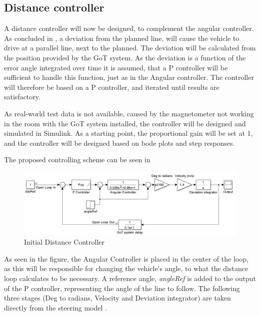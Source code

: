 \subsection{Distance controller}
A distance controller will now be designed, to complement the angular controller.
As concluded in , a deviation from the planned line, will cause the vehicle to drive at a parallel line, next to the planned. The deviation will be calculated from the position provided by the GoT system. As the deviation is a function of the error angle integrated over time it is assumed, that a P controller will be sufficient to handle this function, just as in the Angular controller. The controller will therefore be based on a P controller, and iterated until results are satisfactory. 

As real-world test data is not available, caused by the magnetometer not working in the room with the GoT system installed, the controller will be designed and simulated in Simulink. As a starting point, the proportional gain will be set at 1, and the controller will be designed based on bode plots and step responses.

The proposed controlling scheme can be seen in 

\begin{figure}[H]
\centering
\includegraphics[width=\textwidth]{figures/SteeringSimulink1.png} 
\caption{Initial Distance Controller}
\label{SteeringSimulink}
\end{figure}
As seen in the figure, the Angular Controller is placed in the center of the loop, as this will be responsible for changing the vehicle's angle, to what the distance loop calculates to be necessary. A reference angle, \emph{angleRef} is added to the output of the P controller, representing the angle of the line to follow. The following three stages (Deg to radians, Velocity and Deviation integrator) are taken directly from the steering model .

